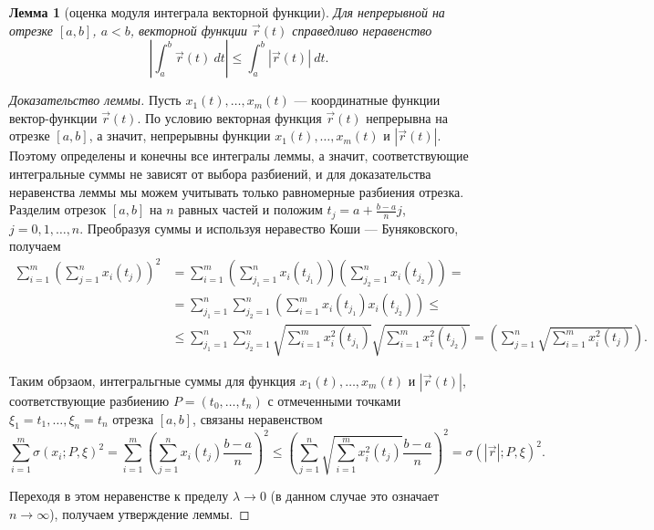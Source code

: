 \documentclass[12pt]{report}
\numberwithin{equation}{section}
\newtheorem{lemma}{Лемма}[section]
\begin{document}
\begin{lemma}[оценка модуля интеграла векторной функции] \label{lemm:19:1}
Для непрерывной на отрезке $[a,b]$, $a < b$, векторной функции $\vec{r}(t)$ справедливо неравенство
\[ \left| \int_a^b \vec{r}(t)~dt \right| \leqslant \int_a^b |\vec{r}(t)|~dt.\]
\end{lemma}
\begin{proof}[Доказательство леммы] Пусть $x_1(t),\ldots,x_m(t)$ --- координатные функции вектор-функции $\vec{r}(t)$. По условию векторная функция $\vec{r}(t)$ непрерывна на отрезке $[a,b]$, а значит, непрерывны функции $x_1(t), \ldots, x_m(t)$ и $|\vec{r}(t)|$. Поэтому определены и конечны все интегралы леммы, а значит, соответствующие интегральные суммы не зависят от выбора разбиений, и для доказательства неравенства леммы мы можем учитывать только равномерные разбиения отрезка. Разделим отрезок $[a,b]$ на $n$ равных частей и положим $t_j = a + \frac{b-a}{n}j$, $j = 0,1,\ldots,n$. Преобразуя суммы и используя неравество Коши --- Буняковского, получаем
\[
\begin{aligned}
\sum_{i=1}^m \left( \sum_{j=1}^n x_i(t_j) \right)^2&= \sum_{i=1}^m\left( \sum_{j_1 = 1}^n x_i (t_{j_1}) \right) \left( \sum_{j_2 = 1}^n x_i (t_{j_2}) \right) =\\
&= \sum_{j_1 = 1}^n \sum_{j_2 = 1}^n \left( \sum_{i=1}^m x_i (t_{j_1}) x_i (t_{j_2}) \right) \leqslant\\
&\leqslant \sum_{j_1 = 1}^n \sum_{j_2 = 1}^n \sqrt{\sum_{i=1}^m x_i^2 (t_{j_1})} \sqrt{\sum_{i=1}^m x_i^2 (t_{j_2})} = \left( \sum_{j=1}^n \sqrt{\sum_{i=1}^m x_i^2 (t_j)}\right).
\end{aligned}\]

Таким обрзаом, интегральгные суммы для функция $x_1(t), \ldots, x_m(t)$ и $|\vec{r}(t)|$, соответствующие разбиению $P = (t_0, \ldots, t_n)$ с отмеченными точками $\xi_1 = t_1, \ldots, \xi_n = t_n$ отрезка $[a,b]$, связаны неравенством
\[\sum_{i=1}^m \sigma(x_i; P, \xi)^2 = \sum_{i=1}^m \left( \sum_{j=1}^n x_i (t_j) \frac{b-a}{n}\right)^2 \leqslant \left( \sum_{j=1}^n \sqrt{\sum_{i=1}^m x_i^2 (t_j)} \frac{b-a}{n}\right)^2 = \sigma(|\vec{r}|; P, \xi)^2.\]

Переходя в этом неравенстве к пределу $\lambda \to 0$ (в данном случае это означает $n \to \infty$), получаем утверждение леммы.
\end{proof}
\end{document}
